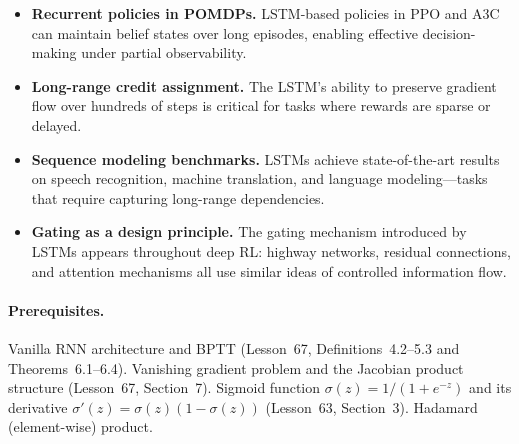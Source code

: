 \documentclass[11pt,a4paper]{article}
\begin{document}
\begin{rlconnection}[title={Why LSTMs Matter for RL/ML}]
\begin{itemize}[nosep]
  \item \textbf{Recurrent policies in POMDPs.}  LSTM-based policies
    in PPO and A3C can maintain belief states over long episodes,
    enabling effective decision-making under partial observability.
  \item \textbf{Long-range credit assignment.}  The LSTM's ability to
    preserve gradient flow over hundreds of steps is critical for
    tasks where rewards are sparse or delayed.
  \item \textbf{Sequence modeling benchmarks.}  LSTMs achieve
    state-of-the-art results on speech recognition, machine
    translation, and language modeling---tasks that require capturing
    long-range dependencies.
  \item \textbf{Gating as a design principle.}  The gating mechanism
    introduced by LSTMs appears throughout deep RL: highway networks,
    residual connections, and attention mechanisms all use similar
    ideas of controlled information flow.
\end{itemize}
\end{rlconnection}

\paragraph{Prerequisites.}
Vanilla RNN architecture and BPTT (Lesson~67, Definitions~4.2--5.3
and Theorems~6.1--6.4).  Vanishing gradient problem and the Jacobian
product structure (Lesson~67, Section~7).  Sigmoid function
$\sigma(z) = 1/(1 + e^{-z})$ and its derivative
$\sigma'(z) = \sigma(z)(1 - \sigma(z))$ (Lesson~63, Section~3).
Hadamard (element-wise) product.
\end{document}

